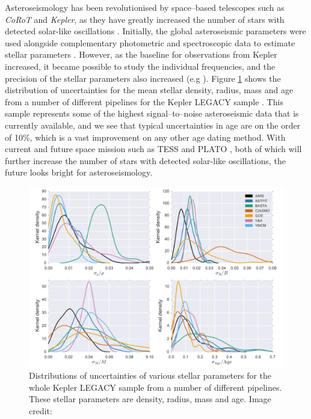 Asteroseismology has been revolutionised by space--based telescopes such as \textit{CoRoT} and \textit{Kepler}, as they have greatly increased the number of stars with detected solar-like oscillations \citep{Chaplin_etal_2011}. Initially, the global asteroseismic parameters were used alongside complementary photometric and spectroscopic data to estimate stellar parameters \citep{Chaplin_etal_2014}. However, as the baseline for observations from Kepler increased, it became possible to study the individual frequencies, and the precision of the stellar parameters also increased (e.g \citealt{Silva_Aguirre_etal_2015}). Figure \ref{fig:VSA_legacy_uncertainties} shows the distribution of uncertainties for the mean stellar density, radius, mass and age from a number of different pipelines for the Kepler LEGACY sample \citep{Lund_etal_2017}. This sample represents some of the highest signal--to--noise asteroseismic data that is currently available, and we see that typical uncertainties in age are on the order of 10\%, which is a vast improvement on any other age dating method. With current and future space mission such as TESS \citep{Ricker_etal_2015} and PLATO \citep{Rauer_etal_2014}, both of which will further increase the number of stars with detected solar-like oscillations, the future looks bright for asteroseismology.

\begin{figure}
    \centering
    \includegraphics[scale=0.4]{Figures/1-Introduction/silva_aguirre_2017_legacy.pdf}
    \caption[Distributions of uncertainties in asteroseismically determined parameters]{Distributions of uncertainties of various stellar parameters for the whole Kepler LEGACY sample from a number of different pipelines. These stellar parameters are density, radius, mass and age. Image credit: \citet{Silva_Aguirre_etal_2017}}
    \label{fig:VSA_legacy_uncertainties}
\end{figure}

